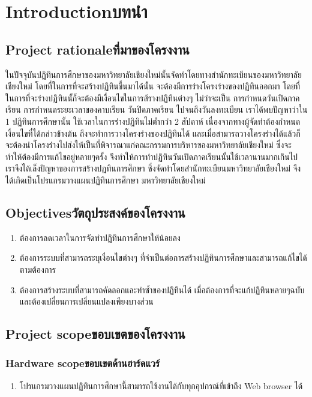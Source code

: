 \chapter{\ifenglish Introduction\else บทนำ\fi}

\section{\ifenglish Project rationale\else ที่มาของโครงงาน\fi}
    ในปัจจุบันปฏิทินการศึกษาของมหาวิทยาลัยเชียงใหม่นั้นจัดทำโดยทางสำนักทะเบียนของมหาวิทยาลัยเชียงใหม่ 
โดยที่ในการที่จะสร้างปฏิทินขึ้นมาได้นั้น จะต้องมีการร่างโครงร่างของปฏิทินออกมา โดยที่ในการที่จะร่างปฏิทินนั้ก็จะต้องมีเงื่อนไขในการส้รางปฏิทินต่างๆ ไม่ว่าจะเป็น การกำหนดวันเปิดภาคเรียน การกำหนดระยะเวลาของคาบเรียน วันปิดภาคเรียน ไปจนถึงวันลงทะเบียน 
เราได้พบปัญหาว่าใน 1 ปฏิทินการศึกษานั้น ใช้เวลาในการร่างปฏิทินไม่ต่ำกว่า 2 สัปดาห์ เนื่องจากทางผู้จัดทำต้องกำหนดเงื่อนไขที่ได้กล่าวข้างต้น ถึงจะทำการวางโครงร่างของปฏิทินได้
และเมื่อสามารถวางโครงร่างได้แล้วก็จะต้องนำโครงร่างไปส่งให้เป็นที่พิจารณาแก่คณะกรรมการบริหารของมหาวิทยาลัยเชียงใหม่ ซึ่งจะทำให้ต้องมีการแก้ไขอยู่หลายๆครั้ง จึงทำให้การทำปฏิทินวันเปิดภาคเรียนนั้นใช้เวลานานมากเกินไป เราจึงได้เล็งปัญหาของการสร้างปฏทินการศึกษา
ซึ่งจัดทำโดยสำนักทะเบียนมหาวิทยาลัยเชียงใหม่ จึงได้เกิดเป็นโปรแกรมวางแผนปฏิทินการศึกษา มหาวิทยาลัยเชียงใหม่


\section{\ifenglish Objectives\else วัตถุประสงค์ของโครงงาน\fi}
\begin{enumerate}
    \item ต้องการลดเวลาในการจัดทำปฏิทินการศึกษาให้น้อยลง
    \item ต้องการระบบที่สามารถระบุเงื่อนไขต่างๆ ที่จำเป็นต่อการสร้างปฏิทินการศึกษาและสามารถแก้ไขได้ตามต้องการ
    \item ต้องการสร้างระบบที่สามารถคัดลอกและทำซ้ำของปฏิทินได้ เมื่อต้องการที่จะแก้ปฏิทินหลายๆฉบับ และต้องเปลี่ยนการเปลี่ยนแปลงเพียงบางส่วน 
\end{enumerate}

\section{\ifenglish Project scope\else ขอบเขตของโครงงาน\fi}

\subsection{\ifenglish Hardware scope\else ขอบเขตด้านฮาร์ดแวร์\fi}
\begin{enumerate}
\item โปรแกรมวางแผนปฏิทินการศึกษานี้สามารถใช้งานได้กับทุกอุปกรณ์ที่เข้าถึง Web browser ได้ 
\end{enumerate}

